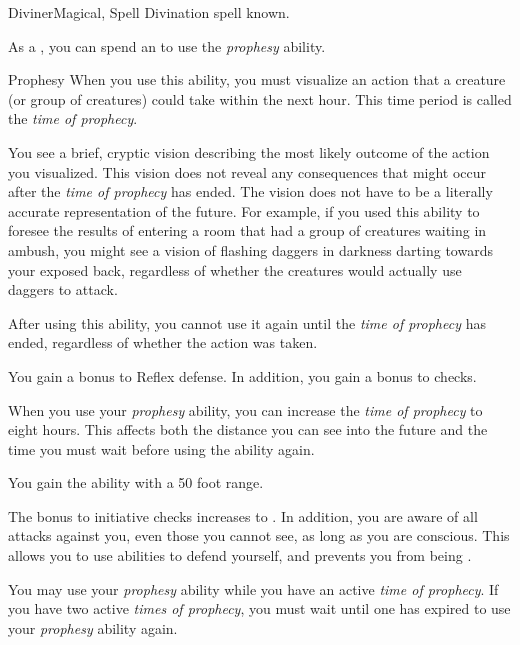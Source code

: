     \begin{feat}{Diviner}{Magical, Spell}
        \featpre Divination spell known.

         As a , you can spend an  to use the \textit{prophesy} ability.
        \begin{ability}{Prophesy}
            When you use this ability, you must visualize an action that a creature (or group of creatures) could take within the next hour.
            This time period is called the \textit{time of prophecy}.

            You see a brief, cryptic vision describing the most likely outcome of the action you visualized.
            This vision does not reveal any consequences that might occur after the \textit{time of prophecy} has ended.
            The vision does not have to be a literally accurate representation of the future.
            For example, if you used this ability to foresee the results of entering a room that had a group of creatures waiting in ambush, you might see a vision of flashing daggers in darkness darting towards your exposed back, regardless of whether the creatures would actually use daggers to attack.

            After using this ability, you cannot use it again until the \textit{time of prophecy} has ended, regardless of whether the action was taken.
        \end{ability}

         You gain a  bonus to Reflex defense.
        In addition, you gain a  bonus to  checks.

         When you use your \textit{prophesy} ability, you can increase the \textit{time of prophecy} to eight hours.
        This affects both the distance you can see into the future and the time you must wait before using the ability again.

         You gain the  ability with a 50 foot range.

         The bonus to initiative checks increases to .
        In addition, you are aware of all attacks against you, even those you cannot see, as long as you are conscious.
        This allows you to use abilities to defend yourself, and prevents you from being \unaware.

         You may use your \textit{prophesy} ability while you have an active \textit{time of prophecy}.
        If you have two active \textit{times of prophecy}, you must wait until one has expired to use your \textit{prophesy} ability again.


\end{feat}
